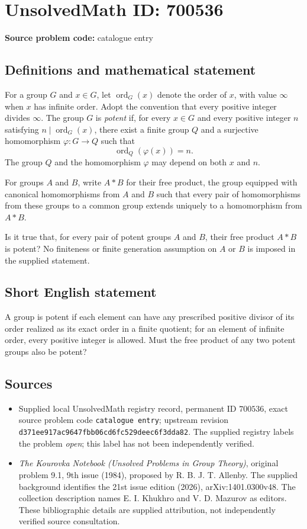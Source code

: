 \documentclass[11pt]{article}
\begin{document}
\section*{UnsolvedMath ID: 700536}
\textbf{Source problem code:} catalogue entry
\subsection{Definitions and mathematical statement}
For a group \(G\) and \(x\in G\), let \(\operatorname{ord}_G(x)\) denote the order of \(x\), with value \(\infty\) when \(x\) has infinite order. Adopt the convention that every positive integer divides \(\infty\). The group \(G\) is \emph{potent} if, for every \(x\in G\) and every positive integer \(n\) satisfying \(n\mid\operatorname{ord}_G(x)\), there exist a finite group \(Q\) and a surjective homomorphism \(\varphi:G\to Q\) such that
\[
\operatorname{ord}_Q(\varphi(x))=n.
\]
The group \(Q\) and the homomorphism \(\varphi\) may depend on both \(x\) and \(n\).

For groups \(A\) and \(B\), write \(A*B\) for their free product, the group equipped with canonical homomorphisms from \(A\) and \(B\) such that every pair of homomorphisms from these groups to a common group extends uniquely to a homomorphism from \(A*B\).

Is it true that, for every pair of potent groups \(A\) and \(B\), their free product \(A*B\) is potent? No finiteness or finite generation assumption on \(A\) or \(B\) is imposed in the supplied statement.
\subsection{Short English statement}
A group is potent if each element can have any prescribed positive divisor of its order realized as its exact order in a finite quotient; for an element of infinite order, every positive integer is allowed. Must the free product of any two potent groups also be potent?
\subsection{Sources}
\begin{itemize}
\item Supplied local UnsolvedMath registry record, permanent ID \(700536\), exact source problem code \texttt{catalogue entry}; upstream revision \texttt{d371ee917ac9647fbb06cd6fc529deec6f3dda82}. The supplied registry labels the problem \emph{open}; this label has not been independently verified.
\item \emph{The Kourovka Notebook (Unsolved Problems in Group Theory)}, original problem 9.1, 9th issue (1984), proposed by R. B. J. T. Allenby. The supplied background identifies the 21st issue edition (2026), arXiv:1401.0300v48. The collection description names E. I. Khukhro and V. D. Mazurov as editors. These bibliographic details are supplied attribution, not independently verified source consultation.
\end{itemize}
\end{document}
